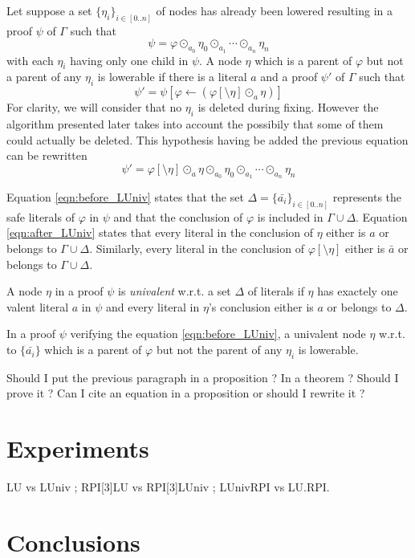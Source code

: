 \documentclass{llncs}
\newcommand{\dual}[1]{{\ensuremath{\bar{#1}}}}
\newenvironment{jogo}{\color{teal}}{}
\begin{document}
Let suppose a set $\{\eta_i\}_{i \in [0..n]}$ of nodes has already been lowered resulting in a proof
$\psi$ of $\Gamma$ such that
\begin{equation} \label{eqn:before_LUniv}
  \psi = \varphi \odot_{a_0} \eta_0 \odot_{a_1} \cdots \odot_{a_n} \eta_n
\end{equation}
with each $\eta_i$ having only one child in $\psi$. A node $\eta$ which is a parent of $\varphi$ but
not a parent of any $\eta_i$ is lowerable if there is a literal $a$ and a proof $\psi'$ of
$\Gamma$ such that
\begin{equation}
  \psi' = \psi[\varphi \leftarrow (\varphi[\setminus \eta] \odot_a \eta)]
\end{equation}
For clarity, we will consider that no $\eta_i$ is deleted during fixing. However the algorithm
presented later takes into account the possibily that some of them could actually be deleted. This
hypothesis having be added the previous equation can be rewritten
\begin{equation} \label{eqn:after_LUniv}
  \psi' = \varphi[\setminus \eta] \odot_a \eta \odot_{a_0} \eta_0 \odot_{a_1} \cdots \odot_{a_n} \eta_n
\end{equation}

Equation \ref{eqn:before_LUniv} states that the set $\Delta = \{\dual{a_i}\}_{i \in [0..n]}$
represents the safe literals of $\varphi$ in $\psi$ and that the conclusion of $\varphi$ is included
in $\Gamma \cup \Delta$. Equation \ref{eqn:after_LUniv} states that every literal in the conclusion
of $\eta$ either is $a$ or belongs to $\Gamma \cup \Delta$. Similarly, every literal in the
conclusion of $\varphi[\setminus \eta]$ either is $\dual{a}$ or belongs to $\Gamma \cup \Delta$.

\begin{definition}
A node $\eta$ in a proof $\psi$ is \emph{univalent} w.r.t. a set $\Delta$ of literals if $\eta$ has
exactely one valent literal $a$ in $\psi$ and every literal in $\eta$'s conclusion either is $a$ or
belongs to $\Delta$.
\end{definition}

In a proof $\psi$ verifying the equation \ref{eqn:before_LUniv}, a univalent node $\eta$ w.r.t. to
$\{\dual{a_i}\}$ which is a parent of $\varphi$ but not the parent of any $\eta_i$ is lowerable.

\begin{jogo}
Should I put the previous paragraph in a proposition ? In a theorem ? Should I prove it ? Can I cite
an equation in a proposition or should I rewrite it ?
\end{jogo}

\section{Experiments}

\begin{jogo}
LU vs LUniv ; RPI[3]LU vs RPI[3]LUniv ; LUnivRPI vs LU.RPI.
\end{jogo}

\section{Conclusions}



\end{document}
